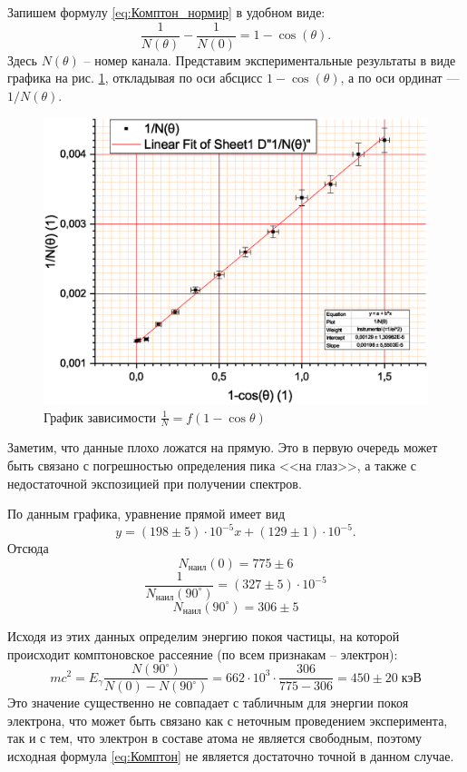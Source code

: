 \documentclass[a4paper]{article}
\renewcommand{\times}{\cdot}
\begin{document}
	Запишем формулу \eqref{eq:Комптон_нормир} в удобном виде:
	\begin{equation}\label{eq:Комптон_число}
		\dfrac{1}{N(\theta)} - \dfrac{1}{N(0)} = 1- \cos(\theta).
	\end{equation}
	Здесь $ N(\theta) $ -- номер канала.
	Представим экспериментальные результаты в виде графика на рис. \ref{fig:graph1}, откладывая по оси абсцисс $ 1- \cos(\theta) $, а по оси ординат --- $ {1}/{N(\theta)} $.
	\begin{figure}
		\centering
		\includegraphics[width=0.8\linewidth]{Graph1}
		\caption{График зависимости $\frac{1}{N} = f(1-\cos \theta)$}
		\label{fig:graph1}
	\end{figure}
	Заметим, что данные плохо ложатся на прямую. Это в первую очередь может быть связано с погрешностью определения пика <<на глаз>>, а также с недостаточной экспозицией при получении спектров. 
	
	По данным графика, уравнение прямой имеет вид\[y = (198\pm 5)\times 10^{-5} x + (129\pm 1)\times 10^{-5}.\]
	Отсюда \[N_{наил}(0) = 775\pm 6\]
	\[\dfrac{1}{N_{наил}(90^\circ)} = (327\pm 5)\times 10^{-5}\]
	\[N_{наил}(90^\circ) = 306\pm 5\]
	
	Исходя из этих данных определим энергию покоя частицы, на которой происходит комптоновское рассеяние (по всем признакам -- электрон):
	\[m c^2 = E_\gamma \dfrac{N(90^\circ)}{N(0)-N(90^\circ)} = 662\times 10^3\times \dfrac{306}{775-306} = 450\pm 20 \; кэВ \]
	Это значение существенно не совпадает с табличным для энергии покоя электрона, что может быть связано как с неточным проведением эксперимента, так и с тем, что электрон  в составе атома не является свободным, поэтому исходная формула \eqref{eq:Комптон} не является достаточно точной в данном случае.	
	
	
\end{document}
